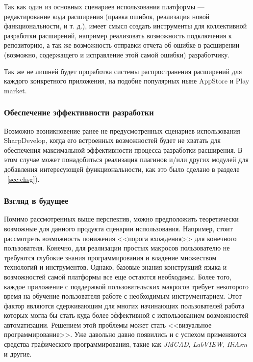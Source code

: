 Так как один из основных сценариев использования платформы --- редактирование кода расширения (правка ошибок, реализация новой фанкциональности, и т. д.), имеет смысл создать инструменты для коллективной разработки расширений, например реализовать возможность подключения к репозиторию, а так же возможность отправки отчета об ошибке в расширении (возможно, содержащего и исправление этой самой ошибки) разработчику.

Так же не лишней будет проработка системы распространения расширений для каждого конкретного приложения, на подобие популярных ныне AppStore и Play market.

\subsubsection{Обеспечение эффективности разработки}

Возможно возникновение ранее не предусмотренных сценариев использования SharpDevelop, когда его встроенных возможностей будет не хватать для обеспечения максимальной эффективности процесса разработки расширения. В этом случае может понадобиться реализация плагинов и/или других модулей для добавления интересующей функциональности, как это было сделано в разделе ~\ref{sec:ehsg}).

\subsubsection{Взгляд в будущее}

Помимо рассмотренных выше перспектив, можно предположить теоретически возможные для данного продукта сценарии использования. Например, стоит рассмотреть возможность понижения <<порога вхождения>> для конечного пользователя. Конечно, для реализации простых макросов пользователю не требуются глубокие знания программирования и владение множеством технологий и инструментов. Однако, базовые знания конструкций языка и возможностей самой платформы все еще остаются необходимы. Более того, каждое приложение с поддержкой пользовательских макросов требует некоторого время на обучение пользователя работе с необходимым  инструментарием. Этот фактор являются сдерживающим для многих начинающих пользователей работа которых могла бы стать куда более эффективной с использованием возможностей автоматизации. Решением этой проблемы может стать <<визуальное программирование>>. Уже давольно давно появились и с успехом применяются средства графического программирования, такие как {\it JMCAD}, {\it LabVIEW}, {\it HiAsm} и другие.

